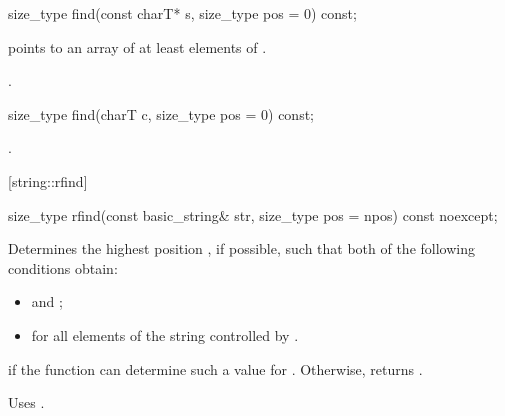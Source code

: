 %
%
\begin{itemdecl}
size_type find(const charT* s, size_type pos = 0) const;
\end{itemdecl}

\begin{itemdescr}
\pnum
\requires {} points to an array of at least 
elements of .

\pnum
\returns
{}.
\end{itemdescr}

%
%
\begin{itemdecl}
size_type find(charT c, size_type pos = 0) const;
\end{itemdecl}

\begin{itemdescr}
\pnum
\returns
{}.
\end{itemdescr}

[string::rfind]{}

%
%
\begin{itemdecl}
size_type rfind(const basic_string& str,
                size_type pos = npos) const noexcept;
\end{itemdecl}

\begin{itemdescr}
\pnum
\effects
Determines the highest position , if possible, such that both of
the following conditions obtain:

\begin{itemize}
\item
{}
and
;
\item
{}%
for all elements  of the string controlled by .
\end{itemize}

\pnum
\returns
{} if the function can determine such a value for .
Otherwise, returns
.

\pnum
\notes
Uses
.
\end{itemdescr}

